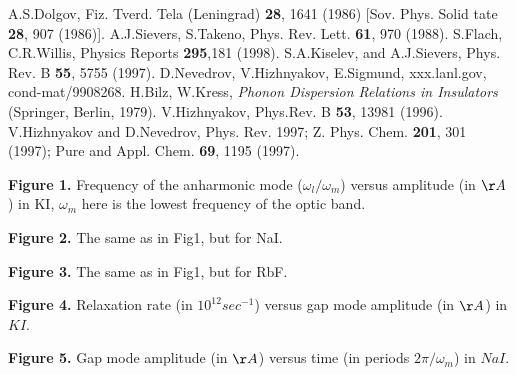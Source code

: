 \documentclass{kapproc}
\begin{document}
\begin{chapthebibliography}{3}

A.S.Dolgov, Fiz. Tverd. Tela (Leningrad) {\bf 28}, 1641 (1986)
[Sov. Phys. Solid tate {\bf 28}, 907 (1986)].
A.J.Sievers, S.Takeno, Phys. Rev. Lett. {\bf 61}, 970 (1988).
S.Flach, C.R.Willis, Physics Reports {\bf 295},181 (1998).
S.A.Kiselev, and A.J.Sievers, Phys. Rev. B {\bf 55}, 5755 (1997).
D.Nevedrov, V.Hizhnyakov, E.Sigmund,
xxx.lanl.gov, cond-mat/9908268.
H.Bilz, W.Kress, {\it Phonon Dispersion Relations in
Insulators} (Springer, Berlin, 1979).
V.Hizhnyakov, Phys.Rev. B {\bf 53}, 13981 (1996).
V.Hizhnyakov and D.Nevedrov, Phys. Rev.      1997;
Z. Phys. Chem. {\bf 201}, 301 (1997);
Pure and Appl. Chem. {\bf 69}, 1195 (1997).

\end{chapthebibliography}

\bigskip

\noindent
{\bf Figure 1.}  Frequency of the anharmonic mode ($\omega_l/\omega_m$)
versus amplitude (in $\AA$) in {\rm KI}, $\omega_m$ here is the lowest
frequency of the optic band.

\noindent
{\bf Figure 2.} The same as in Fig1, but for {\rm NaI}.

\noindent
{\bf Figure 3.}  The same as in Fig1, but for {\rm RbF}.

\noindent
{\bf Figure 4.}  Relaxation rate (in $10^{12} sec^{-1}$) versus gap mode
amplitude (in $\AA$) in $KI$.

\noindent
{\bf Figure 5.}  Gap mode
amplitude (in $\AA$) versus time (in periods $2\pi /\omega_m$) in $NaI$.
\end{document}
